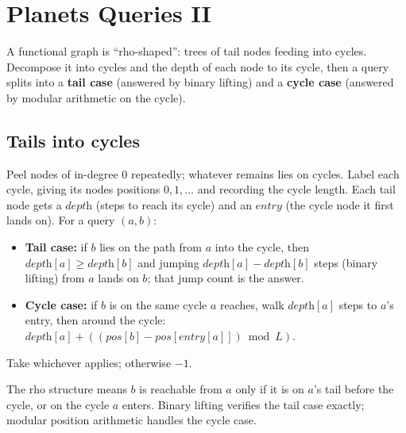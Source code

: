 \section{Planets Queries II}
\label{sec:cses-planets-queries-ii}


\begin{patternbox}
A functional graph is ``rho-shaped'': trees of tail nodes feeding into
cycles. Decompose it into cycles and the depth of each node to its cycle,
then a query splits into a \textbf{tail case} (answered by binary lifting)
and a \textbf{cycle case} (answered by modular arithmetic on the cycle).
\end{patternbox}

\subsection*{Tails into cycles}

Peel nodes of in-degree $0$ repeatedly; whatever remains lies on cycles.
Label each cycle, giving its nodes positions $0,1,\ldots$ and recording the
cycle length. Each tail node gets a $\textit{depth}$ (steps to reach its
cycle) and an $\textit{entry}$ (the cycle node it first lands on). For a
query $(a,b)$:
\begin{itemize}
  \item \textbf{Tail case:} if $b$ lies on the path from $a$ into the
        cycle, then $\textit{depth}[a]\ge\textit{depth}[b]$ and jumping
        $\textit{depth}[a]-\textit{depth}[b]$ steps (binary lifting) from
        $a$ lands on $b$; that jump count is the answer.
  \item \textbf{Cycle case:} if $b$ is on the same cycle $a$ reaches, walk
        $\textit{depth}[a]$ steps to $a$'s entry, then around the cycle:
        $\textit{depth}[a]+((\textit{pos}[b]-\textit{pos}[\textit{entry}[a]])
        \bmod L)$.
\end{itemize}
Take whichever applies; otherwise $-1$.

\begin{ideabox}
The rho structure means $b$ is reachable from $a$ only if it is on $a$'s
tail before the cycle, or on the cycle $a$ enters. Binary lifting verifies
the tail case exactly; modular position arithmetic handles the cycle case.
\end{ideabox}

